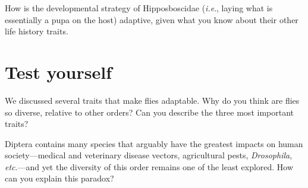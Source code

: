 \begin{theo}
{}How is the developmental strategy of Hipposboscidae (\textit{i.e}., laying what is essentially a pupa on the host) adaptive, given what you know about their other life history traits.
\end{theo}

\section*{Test yourself}

We discussed several traits that make flies adaptable. Why do you think are flies so diverse, relative to other orders? Can you describe the three most important traits?\vspace{3mm}

\noindent{}Diptera contains many species that arguably have the greatest impacts on human society---medical and veterinary disease vectors, agricultural pests, \textit{Drosophila}, \textit{etc}.---and yet the diversity of this order remains one of the least explored. How can you explain this paradox?

\clearpage
\thispagestyle{empty}
